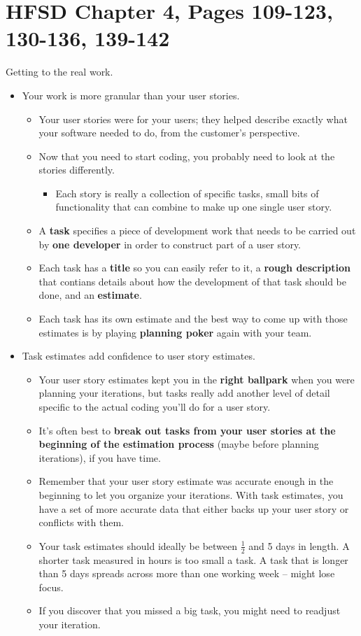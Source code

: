 \documentclass[letterpaper]{article}
\begin{document}
\newpage 
\section{HFSD Chapter 4, Pages 109-123, 130-136, 139-142}
Getting to the real work. 

\begin{itemize}
    \item Your work is more granular than your user stories.
    \begin{itemize}
        \item Your user stories were for your users; they helped describe exactly what your software needed to do, from the customer's perspective. 
        \item Now that you need to start coding, you probably need to look at the stories differently.
        \begin{itemize}
            \item Each story is really a collection of specific tasks, small bits of functionality that can combine to make up one single user story.
        \end{itemize}
        \item A \textbf{task} specifies a piece of development work that needs to be carried out by \textbf{one developer} in order to construct part of a user story. 
        \item Each task has a \textbf{title} so you can easily refer to it, a \textbf{rough description} that contians details about how the development of that task should be done, and an \textbf{estimate}.
        \item Each task has its own estimate and the best way to come up with those estimates is by playing \textbf{planning poker} again with your team.
    \end{itemize}

    \item Task estimates add confidence to user story estimates. 
    \begin{itemize}
        \item Your user story estimates kept you in the \textbf{right ballpark} when you were planning your iterations, but tasks really add another level of detail specific to the actual coding you'll do for a user story. 
        \item It's often best to \textbf{break out tasks from your user stories at the beginning of the estimation process} (maybe before planning iterations), if you have time. 
        \item Remember that your user story estimate was accurate enough in the beginning to let you organize your iterations. With task estimates, you have a set of more accurate data that either backs up your user story or conflicts with them. 
        \item Your task estimates should ideally be between $\frac{1}{2}$ and 5 days in length. A shorter task measured in hours is too small a task. A task that is longer than 5 days spreads across more than one working week -- might lose focus. 
        \item If you discover that you missed a big task, you might need to readjust your iteration. 
    \end{itemize}


\end{itemize}
\end{document}
